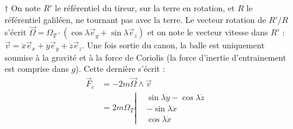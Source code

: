\documentclass{report}
\begin{document}
\begin{itemize}
	
	\item[$\dagger$] On note $R'$ le référentiel du tireur, sur la terre en rotation, et $R$ le référentiel galiléen, ne tournant pas avec la terre. Le vecteur rotation de $R'/R$ s'écrit $\vec{\Omega}=\Omega_T\cdot(\cos\lambda\vec{e}_y+\sin\lambda\vec{e}_z)$ et on note le vecteur vitesse dans $R'$ : $\vec{v}=\dot{x}\vec{e}_x+\dot{y}\vec{e}_y+\dot{z}\vec{e}_z$. Une fois sortie du canon, la balle est uniquement soumise à la gravité et à la force de Coriolis (la force d'inertie d'entrainement est comprise dans $g$). Cette dernière s'écrit :
	\begin{align*}
		\vec{F}_c&=-2m\vec{\Omega}\wedge\vec{v} \\
		&=2m\Omega_T\left\lvert 
      \begin{matrix} 
        &\sin\lambda\dot{y}-\cos\lambda\dot{z}\\ 
        &-\sin\lambda\dot{x} \\
         &\cos\lambda\dot{x}
      \end{matrix}  
    \right.
	\end{align*}


\end{itemize}
\end{document}

